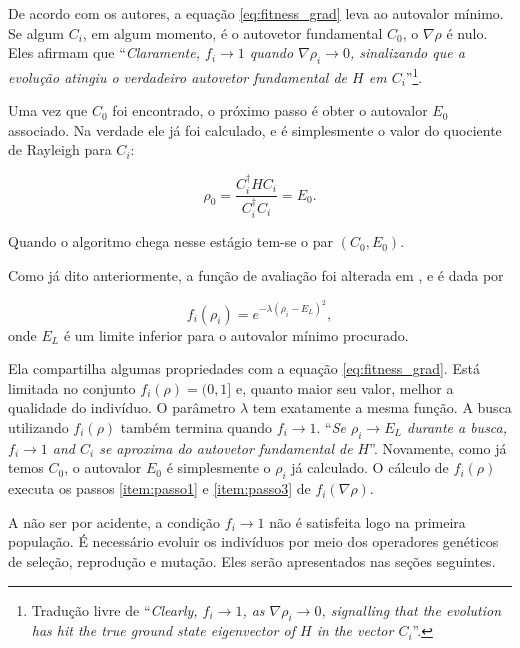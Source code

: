 	De acordo com os autores, a equação \ref{eq:fitness_grad} leva ao autovalor mínimo. Se algum $C_i$, em algum momento, é o autovetor fundamental $C_0$, o $\nabla \rho$ é nulo. Eles afirmam que ``\textit{Claramente, $f_i \rightarrow 1$ quando $\nabla \rho_i \rightarrow 0$, sinalizando que a evolução atingiu o verdadeiro autovetor fundamental de $H$ em $C_i$}''\footnote{Tradução livre de ``\textit{Clearly, $f_i \rightarrow 1$, as $\nabla \rho_i \rightarrow 0$, signalling that the evolution has hit the true ground state eigenvector of $H$ in the vector $C_i$}''.}. 
	
	Uma vez que $C_0$ foi encontrado, o próximo passo é obter o autovalor $E_0$ associado. Na verdade ele já foi calculado, e é simplesmente o valor do quociente de Rayleigh para $C_i$:
	
	\begin{equation}
		\rho_0 = \frac{C_i^{\dagger} H C_i}{C_i^{\dagger} C_i} = E_0.
	\end{equation}
	
	Quando o algoritmo chega nesse estágio tem-se o par $(C_0,E_0)$.
	
	Como já dito anteriormente, a função de avaliação foi alterada em \cite{metodo2011}, e é dada por 
	
	\begin{equation}\label{eq:fitness_EL_metodo}
		f_i(\rho_i) = e^{-\lambda(\rho_i - E_L)^2},
	\end{equation}
	onde $E_L$ é um limite inferior para o autovalor mínimo procurado.
	
	Ela compartilha algumas propriedades com a equação \ref{eq:fitness_grad}. Está limitada no conjunto $f_i(\rho) = (0,1]$ e, quanto maior seu valor, melhor a qualidade do indivíduo. O parâmetro $\lambda$ tem exatamente a mesma função. A busca utilizando $f_i(\rho)$ também termina quando $f_i \rightarrow 1$. ``\emph{Se $\rho_i \rightarrow E_L$ durante a busca, $f_i \rightarrow 1$ and $C_i$ se aproxima do autovetor fundamental de $H$}''. Novamente, como já temos $C_0$, o autovalor $E_0$ é simplesmente o $\rho_i$ já calculado.	O cálculo de $f_i(\rho)$ executa os passos \ref{item:passo1} e \ref{item:passo3} de $f_i(\nabla\rho)$.
				
		A não ser por acidente, a condição $f_i \rightarrow 1$ não é satisfeita logo na primeira população. É necessário evoluir os indivíduos por meio dos operadores genéticos de seleção, reprodução e mutação. Eles serão apresentados nas seções seguintes.

